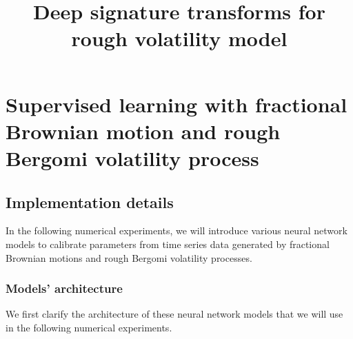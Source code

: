 \documentclass[]{article}
\title{Deep signature transforms for rough volatility model}
\author{}
\date{}
\renewcommand{\(}{\left(}
\renewcommand{\)}{\right)}
\begin{document}
	
	\maketitle
	
	
	\section{Supervised learning with fractional Brownian motion and rough Bergomi volatility process}
	\subsection{Implementation details}\label{sec1}
	In the following numerical experiments, we will introduce various neural network models to calibrate parameters from time series data generated by fractional Brownian motions and rough Bergomi volatility processes.
	\subsubsection{Models' architecture}
	We first clarify the architecture of these neural network models that we will use in the following numerical experiments.
	
\end{document}
